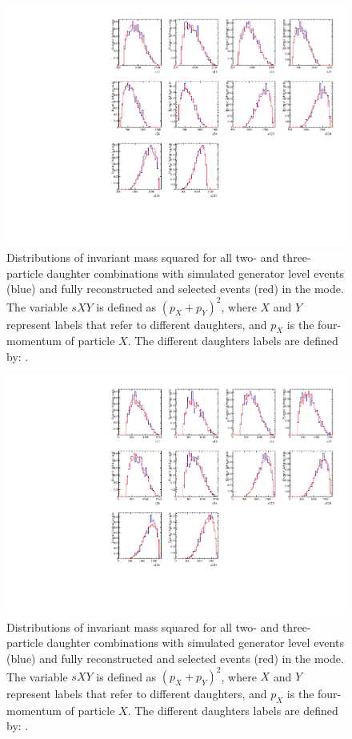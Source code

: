 \begin{figure}[h]
\centering
\includegraphics[width=0.9\linewidth]{figures/results/dalitzDist_KPiPiPi.pdf}
\caption{Distributions of invariant mass squared for all two- and three-particle \Dz daughter combinations with simulated generator level events (blue) and fully reconstructed and selected events (red) in the \kpipipi mode. The variable $sXY$ is defined as $(p_X + p_Y)^2$, where $X$ and $Y$ represent labels that refer to different \Dz daughters, and $p_X$ is the four-momentum of particle $X$. The different \Dz daughters labels are defined by: .}
\label{dalitzk3pi}
\end{figure}

\begin{figure}[h]
\centering
\includegraphics[width=0.9\linewidth]{figures/results/dalitzDist_PiPiPiPi.pdf}
\caption{Distributions of invariant mass squared for all two- and three-particle \Dz daughter combinations with simulated generator level events (blue) and fully reconstructed and selected events (red) in the \pipipipi mode. The variable $sXY$ is defined as $(p_X + p_Y)^2$, where $X$ and $Y$ represent labels that refer to different \Dz daughters, and $p_X$ is the four-momentum of particle $X$. The different \Dz daughters labels are defined by: .}
\label{dalitz4pi}
\end{figure}

